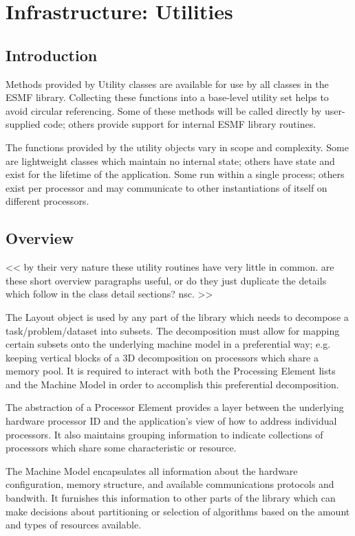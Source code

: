 \section{Infrastructure: Utilities}
\label{sec:utilclasses}

\subsection{Introduction}

Methods provided by Utility classes are available for use by  
all classes in the ESMF library.  Collecting these functions 
into a base-level utility set helps to avoid circular referencing.  
Some of these methods will be called directly by user-supplied
code; others provide support for internal ESMF library routines.

The functions provided by the utility objects vary in scope and
complexity.  Some are lightweight classes which maintain no
internal state; others have state and exist for the lifetime of
the application.  Some run within a single process; others
exist per processor and may communicate to other instantiations
of itself on different processors.

\subsection{Overview}

<< by their very nature these utility routines have very little 
in common.  are these short overview paragraphs useful, or do
they just duplicate the details which follow in the class
detail sections?   nsc. >>

The Layout object is used by any part of the library which needs
to decompose a task/problem/dataset into subsets.
The decomposition must allow for mapping certain subsets onto the
underlying machine model in a preferential way; e.g. keeping
vertical blocks of a 3D decomposition on processors which share
a memory pool.
It is required to interact with both the Processing Element lists
and the Machine Model in order to accomplish this preferential
decomposition.

The abstraction of a Processor Element provides a layer between
the underlying hardware processor ID and the application's view
of how to address individual processors.  It also maintains
grouping information to indicate collections of processors which
share some characteristic or resource.

The Machine Model encapsulates all information about the
hardware configuration, memory structure, and available
communications protocols and bandwith.  It furnishes this
information to other parts of the library which can
make decisions about partitioning or selection of algorithms
based on the amount and types of resources available.

